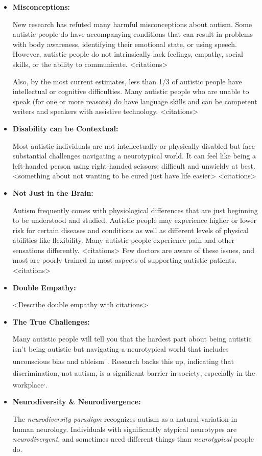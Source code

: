 \documentclass[
  letterpaper,
  DIV=11,
  numbers=noendperiod]{scrreprt}
\begin{document}
\begin{itemize}
\item
  \textbf{Misconceptions:}

  New research has refuted many harmful misconceptions about autism.
  Some autistic people do have accompanying conditions that can result
  in problems with body awareness, identifying their emotional state, or
  using speech. However, autistic people do not intrinsically lack
  feelings, empathy, social skills, or the ability to communicate.
  \textless citations\textgreater{}

  Also, by the most current estimates, less than 1/3 of autistic people
  have intellectual or cognitive difficulties. Many autistic people who
  are unable to speak (for one or more reasons) do have language skills
  and can be competent writers and speakers with assistive technology.
  \textless citations\textgreater{}
\item
  \textbf{Disability can be Contextual:}

  Most autistic individuals are not intellectually or physically
  disabled but face substantial challenges navigating a neurotypical
  world. It can feel like being a left-handed person using right-handed
  scissors: difficult and unwieldy at best. \textless something about
  not wanting to be cured just have life easier\textgreater{}
  \textless citations\textgreater{}
\item
  \textbf{Not Just in the Brain:}

  Autism frequently comes with physiological differences that are just
  beginning to be understood and studied. Autistic people may experience
  higher or lower risk for certain diseases and conditions as well as
  different levels of physical abilities like flexibility. Many autistic
  people experience pain and other sensations differently.
  \textless citations\textgreater{} Few doctors are aware of these
  issues, and most are poorly trained in most aspects of supporting
  autistic patients. \textless citations\textgreater{}
\item
  \textbf{Double Empathy:}

  \textless Describe double empathy with citations\textgreater{}
\item
  \textbf{The True Challenges:}

  Many autistic people will tell you that the hardest part about being
  autistic isn't being autistic but navigating a neurotypical world that
  includes unconscious bias and
  ableism\textsuperscript{--}.
  Research backs this up, indicating that discrimination, not autism, is
  a significant barrier in
  society\textsuperscript{}, especially in the
  workplace\textsuperscript{,}.
\item
  \textbf{Neurodiversity \& Neurodivergence:}

  The \emph{neurodiversity paradigm} recognizes autism as a natural
  variation in human neurology. Individuals with significantly atypical
  neurotypes are \emph{neurodivergent}, and sometimes need different
  things than \emph{neurotypical} people do.
\end{itemize}
\end{document}
